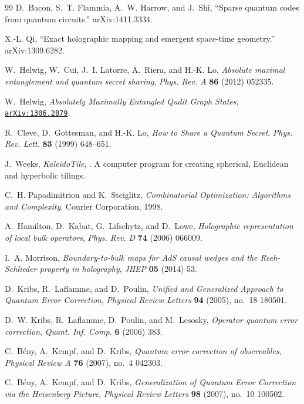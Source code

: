 \documentclass[12pt]{article}
\theoremstyle{plain}
\theoremstyle{plain}
\theoremstyle{plain}
\theoremstyle{plain}
\theoremstyle{result}
\theoremstyle{remark}
\theoremstyle{conjecture}
\theoremstyle{observation}
\theoremstyle{definition}
\theoremstyle{corollary}
\theoremstyle{definition}
\theoremstyle{definition}
\theoremstyle{assumption}
\theoremstyle{definition}
\theoremstyle{problem}
\theoremstyle{fact}
\begin{document}
\begin{thebibliography}{99}
D.~Bacon, S.~T. Flammia, A.~W. Harrow, and J.~Shi, ``Sparse quantum codes from
  quantum circuits.'' arXiv:1411.3334.

X.-L. Qi, ``Exact holographic mapping and emergent space-time geometry.''
  arXiv:1309.6282.


W.~Helwig, W.~Cui, J.~I. Latorre, A.~Riera, and H.-K. Lo, {\it {Absolute
  maximal entanglement and quantum secret sharing}},  {\em Phys. Rev. A} {\bf
  86} (2012) 052335.

W.~Helwig, {\it {Absolutely Maximally Entangled Qudit Graph States}},
  \href{http://arxiv.org/abs/1306.2879}{{\tt arXiv:1306.2879}}.

R.~Cleve, D.~Gottesman, and H.-K. Lo, {\it {How to Share a Quantum Secret}},
  {\em Phys. Rev. Lett.} {\bf 83} (1999) 648--651.

J.~Weeks, {\it {KaleidoTile}}, . A computer program for creating spherical,
  Euclidean and hyperbolic tilings.

C.~H. Papadimitriou and K.~Steiglitz, {\em {Combinatorial Optimization:
  Algorithms and Complexity}}.
\newblock Courier Corporation, 1998.

A.~Hamilton, D.~Kabat, G.~Lifschytz, and D.~Lowe, {\it {Holographic
  representation of local bulk operators}},  {\em Phys. Rev. D} {\bf 74} (2006)
  066009.

I.~A. Morrison, {\it {Boundary-to-bulk maps for AdS causal wedges and the
  Reeh-Schlieder property in holography}},  {\em JHEP} {\bf 05} (2014) 53.

D.~Kribs, R.~Laflamme, and D.~Poulin, {\it {Unified and Generalized Approach to
  Quantum Error Correction}},  {\em Physical Review Letters} {\bf 94} (2005),
  no.~18 180501.

D.~W. Kribs, R.~Laflamme, D.~Poulin, and M.~Lesosky, {\it {Operator quantum
  error correction}},  {\em Quant. Inf. Comp.} {\bf 6} (2006) 383.

C.~B\'{e}ny, A.~Kempf, and D.~Kribs, {\it {Quantum error correction of
  observables}},  {\em Physical Review A} {\bf 76} (2007), no.~4 042303.

C.~B\'{e}ny, A.~Kempf, and D.~Kribs, {\it {Generalization of Quantum Error
  Correction via the Heisenberg Picture}},  {\em Physical Review Letters} {\bf
  98} (2007), no.~10 100502.


\end{thebibliography}
\end{document}
